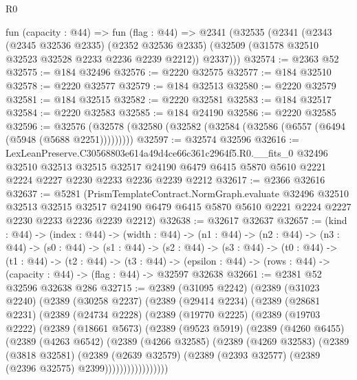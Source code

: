 \begin{lexlean}{R0}
\begin{coremodule}
  fun (capacity : @44) =>
  fun (flag : @44) =>
  @2341
    (@32535
      (@2341
        (@2343
          (@2345 @32536 @2335)
          (@2352 @32536 @2335)
          (@32509 (@31578 @32510 @32523 @32528 @2233 @2236 @2239 @2212))
          @2337)))
@32574 := @2363 @52
@32575 := @184 @32496
@32576 := @2220 @32575
@32577 := @184 @32510
@32578 := @2220 @32577
@32579 := @184 @32513
@32580 := @2220 @32579
@32581 := @184 @32515
@32582 := @2220 @32581
@32583 := @184 @32517
@32584 := @2220 @32583
@32585 := @184 @24190
@32586 := @2220 @32585
@32596 := @32576 (@32578 (@32580 (@32582 (@32584 (@32586 (@6557 (@6494 (@5948 (@5688 @2251)))))))))
@32597 := @32574 @32596
@32616 := LexLeanPreserve.C30568803e614a49d4ce66c361c2964f5.R0.__fits_0
    @32496
    @32510
    @32513
    @32515
    @32517
    @24190
    @6479
    @6415
    @5870
    @5610
    @2221
    @2224
    @2227
    @2230
    @2233
    @2236
    @2239
    @2212
@32617 := @2366 @32616
@32637 := @5281
    (PrismTemplateContract.NormGraph.evaluate
      @32496
      @32510
      @32513
      @32515
      @32517
      @24190
      @6479
      @6415
      @5870
      @5610
      @2221
      @2224
      @2227
      @2230
      @2233
      @2236
      @2239
      @2212)
@32638 := @32617 @32637
@32657 := (kind : @44) ->
  (index : @44) ->
  (width : @44) ->
  (n1 : @44) ->
  (n2 : @44) ->
  (n3 : @44) ->
  (s0 : @44) ->
  (s1 : @44) ->
  (s2 : @44) ->
  (s3 : @44) ->
  (t0 : @44) ->
  (t1 : @44) ->
  (t2 : @44) ->
  (t3 : @44) -> (epsilon : @44) -> (rows : @44) -> (capacity : @44) -> (flag : @44) -> @32597 @32638
@32661 := @2381 @52 @32596 @32638 @286
@32715 := @2389
    (@31095 @2242)
    (@2389
      (@31023 @2240)
      (@2389
        (@30258 @2237)
        (@2389
          (@29414 @2234)
          (@2389
            (@28681 @2231)
            (@2389
              (@24734 @2228)
              (@2389
                (@19770 @2225)
                (@2389
                  (@19703 @2222)
                  (@2389
                    (@18661 @5673)
                    (@2389
                      (@9523 @5919)
                      (@2389
                        (@4260 @6455)
                        (@2389
                          (@4263 @6542)
                          (@2389
                            (@4266 @32585)
                            (@2389
                              (@4269 @32583)
                              (@2389
                                (@3818 @32581)
                                (@2389
                                  (@2639 @32579)
                                  (@2389 (@2393 @32577) (@2389 (@2396 @32575) @2399)))))))))))))))))

\end{coremodule}
\end{lexlean}
